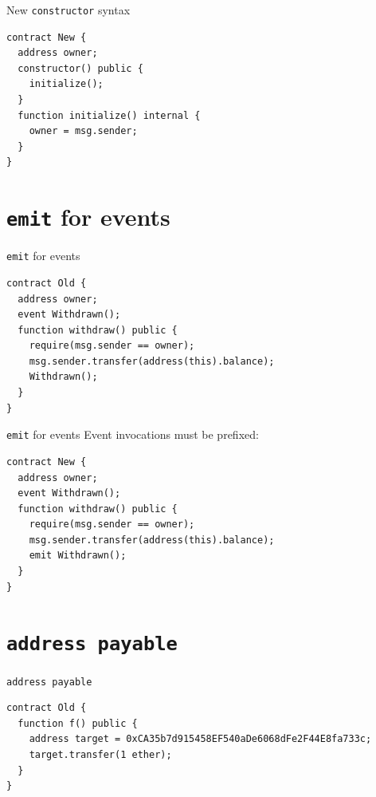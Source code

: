 \documentclass[aspectratio=169,10pt]{beamer}
\begin{document}
\begin{frame}[fragile]{New \texttt{constructor} syntax}
  \begin{mdframed}
  \begin{lstlisting}[language=Solidity]
contract New {
  address owner;
  constructor() public {
    initialize();
  }
  function initialize() internal {
    owner = msg.sender; 
  }
}
  \end{lstlisting}
  \end{mdframed}
\end{frame}

\section{\texttt{emit} for events}

\begin{frame}[fragile]{\texttt{emit} for events}
  \begin{mdframed}
  \begin{lstlisting}[language=Solidity]
contract Old {
  address owner;
  event Withdrawn();
  function withdraw() public {
    require(msg.sender == owner);
    msg.sender.transfer(address(this).balance);
    Withdrawn();
  }
}
  \end{lstlisting}
  \end{mdframed}
\end{frame}

\begin{frame}[fragile]{\texttt{emit} for events}
  Event invocations must be prefixed:
  \begin{mdframed}
  \begin{lstlisting}[language=Solidity]
contract New {
  address owner;
  event Withdrawn();
  function withdraw() public {
    require(msg.sender == owner);
    msg.sender.transfer(address(this).balance);
    emit Withdrawn();
  }
}
  \end{lstlisting}
  \end{mdframed}
\end{frame}

\section{\texttt{address payable}}

\begin{frame}[fragile]{\texttt{address payable}}
  \begin{mdframed}
  \begin{lstlisting}[language=Solidity]
contract Old {
  function f() public {
    address target = 0xCA35b7d915458EF540aDe6068dFe2F44E8fa733c;
    target.transfer(1 ether);
  }
}
  \end{lstlisting}
  \end{mdframed}
\end{frame}
\end{document}
